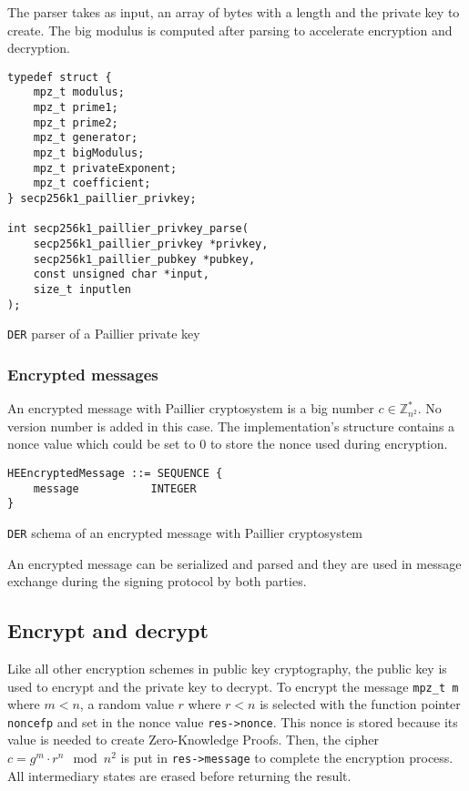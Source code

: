 The parser takes as input, an array of bytes with a length and the private key to
create. The big modulus is computed after parsing to accelerate encryption
and decryption.

\begin{listing}
  \begin{verbatim}
typedef struct {
    mpz_t modulus;
    mpz_t prime1;
    mpz_t prime2;
    mpz_t generator;
    mpz_t bigModulus;
    mpz_t privateExponent;
    mpz_t coefficient;
} secp256k1_paillier_privkey;

int secp256k1_paillier_privkey_parse(
    secp256k1_paillier_privkey *privkey,
    secp256k1_paillier_pubkey *pubkey,
    const unsigned char *input,
    size_t inputlen
);
  \end{verbatim}
	\caption{\texttt{DER} parser of a Paillier private key}
	\label{lst:DERImplPaillierParsePriv}
\end{listing}

\subsubsection{Encrypted messages}

An encrypted message with Paillier cryptosystem is a big number $c \in
\mathbb{Z}_{n^2}^*$. No version number is added in this case. The implementation's
structure contains a nonce value which could be set to 0 to store the nonce used
during encryption.

\begin{listing}
  \begin{verbatim}
HEEncryptedMessage ::= SEQUENCE {
    message           INTEGER
}
  \end{verbatim}
	\caption{\texttt{DER} schema of an encrypted message with Paillier cryptosystem}
	\label{lst:DERSchemaPaillierEncMessage}
\end{listing}

An encrypted message can be serialized and parsed and they are used in message
exchange during the signing protocol by both parties.

\subsection{Encrypt and decrypt}

Like all other encryption schemes in public key cryptography, the public key is
used to encrypt and the private key to decrypt. To encrypt the message
\texttt{mpz\_t m} where $m < n$, a random value $r$ where $r < n$ is selected
with the function pointer \texttt{noncefp} and set in the nonce value
\texttt{res->nonce}. This nonce is stored because its value is needed to create
Zero-Knowledge Proofs. Then, the cipher $c = g^m \cdot r^n \mod n^2$ is put
in \texttt{res->message} to complete the encryption process. All intermediary
states are erased before returning the result.

